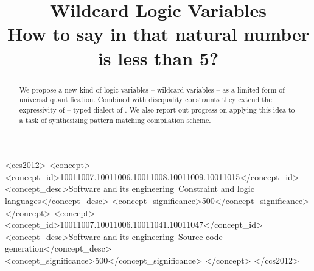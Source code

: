 \documentclass
  [screen
  , acmlarge
  ,review
  ]{acmart}
\begin{document}
\title{Wildcard Logic Variables\\
  \large  How to say in \miniKanren{} that natural number is less than 5? }






%

\begin{abstract}
We propose a new kind of logic variables -- wildcard variables -- as a limited form of universal quantification. Combined with disequality constraints they extend the expressivity of \OCanren{} -- typed dialect of \miniKanren{}. We also report out progress on applying this idea to a task of synthesizing pattern matching compilation scheme.
\end{abstract}


\begin{CCSXML}
<ccs2012>
<concept>
<concept_id>10011007.10011006.10011008.10011009.10011015</concept_id>
<concept_desc>Software and its engineering~Constraint and logic languages</concept_desc>
<concept_significance>500</concept_significance>
</concept>
<concept>
<concept_id>10011007.10011006.10011041.10011047</concept_id>
<concept_desc>Software and its engineering~Source code generation</concept_desc>
<concept_significance>500</concept_significance>
</concept>
</ccs2012>
\end{CCSXML}
\end{document}
